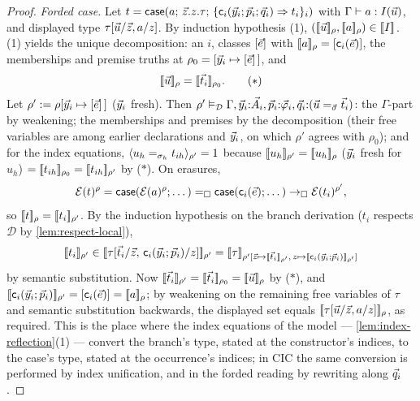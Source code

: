 \begin{proof}
\emph{Forded case.}  Let $t = \mathsf{case}(a;\,\vec{z}.z.\tau;\,\{\mathsf{c}_i(\vec{y}_i;\vec{p}_i;\vec{q}_i) \Rightarrow t_i\}_i)$ with
$\Gamma \vdash a : I(\vec{u})$, and displayed type $\tau[\vec{u}/\vec{z},
a/z]$.  By induction hypothesis (1), $([\![ \vec{u} ]\!]_\rho, [\![ a ]\!]_\rho)
\in [\![ I ]\!]_{}$.  (1) yields the unique
decomposition: an $i$, classes $[\vec{e}]$ with $[\![ a ]\!]_\rho =
[\mathsf{c}_i(\vec{e})]$, the memberships and premise truths at
$\rho_0 = [\vec{y}_i \mapsto [\vec{e}]\,]$, and
\begin{equation}
  [\![ \vec{u} ]\!]_\rho = [\![ \vec{t}_i ]\!]_{\rho_0}.
  \tag{$*$}
\end{equation}
Let $\rho' \mathrel{:=} \rho[\vec{y}_i \mapsto [\vec{e}]\,]$ ($\vec{y}_i$
fresh).  Then $\rho' \vDash_{\mathcal{D}} \Gamma, \vec{y}_i{:}\vec{A}_i,
\vec{p}_i{:}\vec{\varphi}_i, \vec{q}_i{:}(\vec{u} =_{\vec{\sigma}}
\vec{t}_i)$: the $\Gamma$-part by weakening; the memberships and
premises by the decomposition (their free variables are among earlier
declarations and $\vec{y}_i$, on which $\rho'$ agrees with $\rho_0$);
and for the index equations,
$\langle u_h =_{\sigma_h} t_{ih} \rangle_{\rho'} = 1$ because $[\![ u_h ]\!]_{\rho'} =
[\![ u_h ]\!]_\rho$ ($\vec{y}_i$ fresh for $u_h$) $=
[\![ t_{ih} ]\!]_{\rho_0} = [\![ t_{ih} ]\!]_{\rho'}$ by ($*$).  On erasures,
\[
  \mathcal{E}(t)^{\rho} = \mathsf{case}(\mathcal{E}(a)^{\rho}; \dots)
  =_{\square} \mathsf{case}(\mathsf{c}_i(\vec{e}); \dots)
  \rightarrow_{\square} \mathcal{E}(t_i)^{\rho'},
\]
so $[\![ t ]\!]_\rho = [\![ t_i ]\!]_{\rho'}$.  By the induction hypothesis on
the branch derivation ($t_i$ respects $\mathcal{D}$ by
\cref{lem:respect-local}),
\[
  \sem{t_i}_{\rho'} \in
  \semr{\tau[\tup{t}_i/\tup{z},\,
    \wcns{c}_i(\tup{y}_i;\tup{p}_i)/z]}{\rho'}
  = \semr{\tau}{\rho'[\tup{z} \mapsto \sem{\tup{t}_i}_{\rho'},\,
      z \mapsto \sem{\wcns{c}_i(\tup{y}_i;\tup{p}_i)}_{\rho'}]}
\]
by semantic substitution.  Now $[\![ \vec{t}_i ]\!]_{\rho'} =
[\![ \vec{t}_i ]\!]_{\rho_0} = [\![ \vec{u} ]\!]_\rho$ by ($*$), and
$[\![ \mathsf{c}_i(\vec{y}_i;\vec{p}_i) ]\!]_{\rho'} =
[\mathsf{c}_i(\vec{e})] = [\![ a ]\!]_\rho$; by weakening on the remaining
free variables of $\tau$ and semantic substitution backwards, the
displayed set equals $[\![ \tau[\vec{u}/\vec{z}, a/z] ]\!]_{\rho}$, as
required.  This is the place where the index equations of the model ---
\cref{lem:index-reflection}(1) --- convert the branch's type, stated at
the constructor's indices, to the case's type, stated at the
occurrence's indices; in CIC the same conversion is performed by index
unification, and in the forded reading by rewriting along $\vec{q}_i$.


\end{proof}
